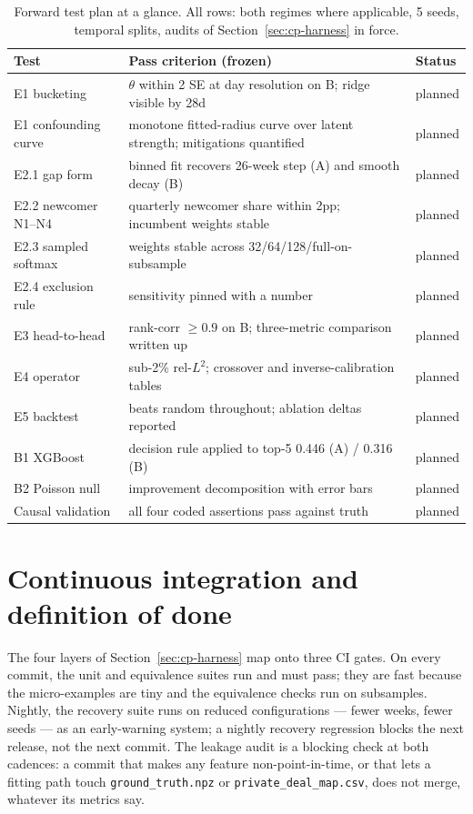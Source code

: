 \begin{table}[htbp]
\centering
\footnotesize
\begin{tabular}{lp{7.9cm}l}
\toprule
Test & Pass criterion (frozen) & Status \\
\midrule
E1 bucketing & $\theta$ within 2 SE at day resolution on B; ridge visible by 28d & planned \\
E1 confounding curve & monotone fitted-radius curve over latent strength; mitigations quantified & planned \\
E2.1 gap form & binned fit recovers 26-week step (A) and smooth decay (B) & planned \\
E2.2 newcomer N1--N4 & quarterly newcomer share within 2pp; incumbent weights stable & planned \\
E2.3 sampled softmax & weights stable across 32/64/128/full-on-subsample & planned \\
E2.4 exclusion rule & sensitivity pinned with a number & planned \\
E3 head-to-head & rank-corr $\ge 0.9$ on B; three-metric comparison written up & planned \\
E4 operator & sub-2\% rel-$L^2$; crossover and inverse-calibration tables & planned \\
E5 backtest & beats random throughout; ablation deltas reported & planned \\
B1 XGBoost & decision rule applied to top-5 0.446 (A) / 0.316 (B) & planned \\
B2 Poisson null & improvement decomposition with error bars & planned \\
Causal validation & all four coded assertions pass against truth & planned \\
\bottomrule
\end{tabular}
\caption{Forward test plan at a glance. All rows: both regimes where applicable, 5 seeds, temporal splits,
audits of Section~\ref{sec:cp-harness} in force.}
\label{tab:cp-forward}
\end{table}

\section{Continuous integration and definition of done}
\label{sec:cp-ci}

The four layers of Section~\ref{sec:cp-harness} map onto three CI gates. On every commit, the unit and
equivalence suites run and must pass; they are fast because the micro-examples are tiny and the equivalence
checks run on subsamples. Nightly, the recovery suite runs on reduced configurations --- fewer weeks, fewer
seeds --- as an early-warning system; a nightly recovery regression blocks the next release, not the next
commit. The leakage audit is a blocking check at both cadences: a commit that makes any feature
non-point-in-time, or that lets a fitting path touch \texttt{ground\_truth.npz} or
\texttt{private\_deal\_map.csv}, does not merge, whatever its metrics say.

